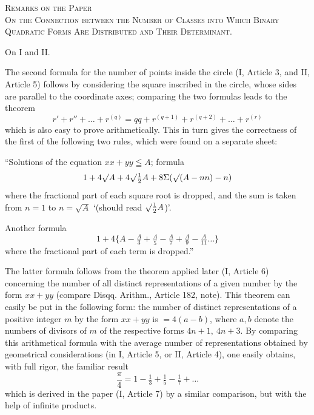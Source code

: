 \par\bigskip{}
\begin{center}
\textsc{Remarks on the Paper}\\[1em]
\textsc{On the Connection between the Number of Classes into Which Binary Quadratic Forms Are Distributed and Their Determinant.}
\end{center}
\par\medskip{}\centerline{On I and II.}\smallskip

The second formula for the number of points inside the circle (I, Article 3, and II, Article 5) follows by considering the square inscribed in the circle, whose sides are parallel to the coordinate axes; comparing the two formulas leads to the theorem
\[
r'+r''+\ldots+r^{(q)}=qq+r^{(q+1)}+r^{(q+2)}+\ldots+r^{(r)}
\]
which is also easy to prove arithmetically. This in turn gives the correctness of the first of the following two rules, which were found on a separate sheet:

“Solutions of the equation $xx+yy\leqq A$; formula
\[
1+4\surd A+4\surd\tfrac12 A+8\Sigma(\surd(A-nn)-n)
\]
where the fractional part of each square root is dropped, and the sum is taken from $n=1$ to $n=\surd A$ ‘(should read $\surd\tfrac12 A$)’.

Another formula
\[
1+4\{A-\tfrac A3+\tfrac A5-\tfrac A7+\tfrac A9-\tfrac A{11}\ldots\}
\]
where the fractional part of each term is dropped.”

The latter formula follows from the theorem applied later (I, Article 6) concerning the number of all distinct representations of a given number by the form $xx+yy$ (compare Disqq. Arithm., Article 182, note). This theorem can easily be put in the following form: the number of distinct representations of a positive integer $m$ by the form $xx+yy$ is $=4(a-b)$, where $a,b$ denote the numbers of divisors of $m$ of the respective forms $4n+1,\ 4n+3$. By comparing
this arithmetical formula with the average number of representations obtained by geometrical considerations (in I, Article 5, or II, Article 4), one easily obtains, with full rigor, the familiar result
\[
\frac\pi4=1-\tfrac13+\tfrac15-\tfrac17+\ldots
\]
which is derived in the paper (I, Article 7) by a similar comparison, but with the help of infinite products.
